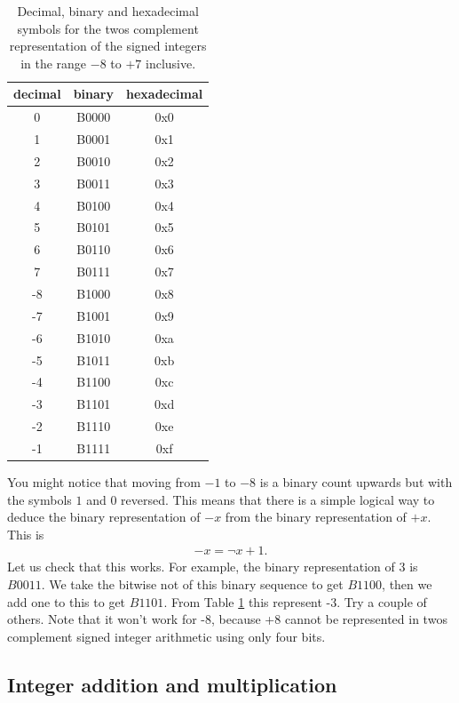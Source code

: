 \documentclass[../physical_computing.tex]{subfiles}
\begin{document}
\begin{table}[hbt]
    \centering
    \begin{tabular}{|c|c|c|}
    \hline
         decimal & binary & hexadecimal \\
         \hline\hline
         0 & B0000 & 0x0 \\
         1 & B0001 & 0x1 \\
         2 & B0010 & 0x2 \\
         3 & B0011 & 0x3 \\
         4 & B0100 & 0x4 \\
         5 & B0101 & 0x5 \\
         6 & B0110 & 0x6 \\
         7 & B0111 & 0x7 \\
         -8 & B1000 & 0x8 \\
         -7 & B1001 & 0x9 \\
         -6 & B1010 & 0xa \\
         -5 & B1011 & 0xb \\
         -4 & B1100 & 0xc \\
         -3 & B1101 & 0xd \\
         -2 & B1110 & 0xe \\
         -1 & B1111 & 0xf \\
        \hline
    \end{tabular}
    \caption{Decimal, binary and hexadecimal symbols for the twos complement representation of the signed integers in the range $-8$ to $+7$ inclusive.}
    \label{tab:twoscomplement}
\end{table}

You might notice that moving from $-1$ to $-8$ is a binary count upwards but with the symbols $1$ and $0$ reversed. This means that there is a simple logical way to deduce the binary representation of $-x$ from the binary representation of $+x$. This is
\begin{align}
    -x=\neg x+1.
\end{align}
Let us check that this works. For example, the binary representation of 3 is $B0011$. We take the bitwise not of this binary sequence to get $B1100$, then we add one to this to get $B1101$. From Table \ref{tab:twoscomplement} this represent -3. Try a couple of others. Note that it won't work for -8, because +8 cannot be represented in twos complement signed integer arithmetic using only four bits.

\subsection{Integer addition and multiplication}
\label{sec:addmultiply}
\end{document}
